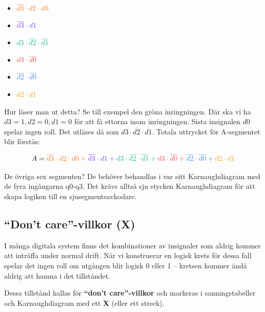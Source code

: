 \documentclass[
  swedish,
  letterpaper,
  oneside,
  openany]{book}
\providecommand{\tightlist}{%
  \setlength{\itemsep}{0pt}\setlength{\parskip}{0pt}}
\begin{document}
\begin{tcolorbox}
\begin{itemize}
\tightlist
\item
  \(\color{highlight_249_115_022} \overline{d3} \cdot d2 \cdot d0\)
\item
  \(\color{highlight_124_058_237} \overline{d3} \cdot d1\)
\item
  \(\color{highlight_016_185_129} d3 \cdot \overline{d2} \cdot \overline{d1}\)
\item
  \(\color{highlight_239_068_068} d3 \cdot \overline{d0}\)
\item
  \(\color{highlight_059_130_246} \overline{d2} \cdot \overline{d0}\)
\item
  \(\color{highlight_245_158_011} d2 \cdot d1\)
\end{itemize}

Hur läser man ut detta? Se till exempel den gröna inringningen. Där ska
vi ha \(d3 = 1, d2 = 0, d1 = 0\) för att få ettorna inom inringningen.
Sista insignalen \(d0\) spelar ingen roll. Det utläses då som
\(d3 \cdot \overline{d2} \cdot \overline{d1}\). Totala uttrycket för
A-segmentet blir förstås:

\[A = \color{highlight_249_115_022} \overline{d3} \cdot d2 \cdot d0 + \color{highlight_124_058_237} \overline{d3} \cdot d1 + \color{highlight_016_185_129} d3 \cdot \overline{d2} \cdot \overline{d1} + \color{highlight_239_068_068} d3 \cdot \overline{d0} + \color{highlight_059_130_246} \overline{d2} \cdot \overline{d0} + \color{highlight_245_158_011} d2 \cdot d1\]

\end{tcolorbox}

De övriga sex segmenten? De behöver behandlas i var sitt Karnaughdiagram
med de fyra ingångarna q0-q3. Det krävs alltså sju stycken
Karnaughdiagram för att skapa logiken till en sjusegmentsavkodare.

\subsection{``Don't care''-villkor (X)}\label{sec-dont-care}

I många digitala system finns det kombinationer av insignaler som aldrig
kommer att inträffa under normal drift. När vi konstruerar en logisk
krets för dessa fall spelar det ingen roll om utgången blir logisk 0
eller 1 -- kretsen kommer ändå aldrig att hamna i det tillståndet.

Dessa tillstånd kallas för \textbf{``don't care''-villkor} och markeras
i sanningstabeller och Karnaughdiagram med ett \textbf{X} (eller ett
streck).
\end{document}
